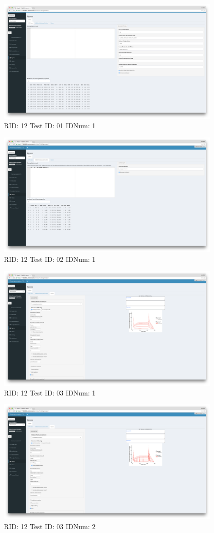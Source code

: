 \begin{figure}[H]
\includegraphics[width=.8\textwidth]{screencaps/12-01-1.png}
\caption{RID: 12 Test ID: 01 IDNum: 1}
\end{figure}
\begin{figure}[H]
\includegraphics[width=.8\textwidth]{screencaps/12-02-1.png}
\caption{RID: 12 Test ID: 02 IDNum: 1}
\end{figure}
\begin{figure}[H]
\includegraphics[width=.8\textwidth]{screencaps/12-03-1.png}
\caption{RID: 12 Test ID: 03 IDNum: 1}
\end{figure}
\begin{figure}[H]
\includegraphics[width=.8\textwidth]{screencaps/12-03-2.png}
\caption{RID: 12 Test ID: 03 IDNum: 2}
\end{figure}
